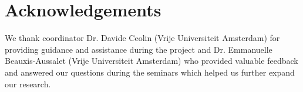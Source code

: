 \section{Acknowledgements}

We thank coordinator Dr. Davide Ceolin (Vrije Universiteit Amsterdam) for providing guidance and assistance during the project and Dr. Emmanuelle Beauxis-Aussalet (Vrije Universiteit Amsterdam) who provided valuable feedback and answered our questions during the seminars which helped us further expand our research.